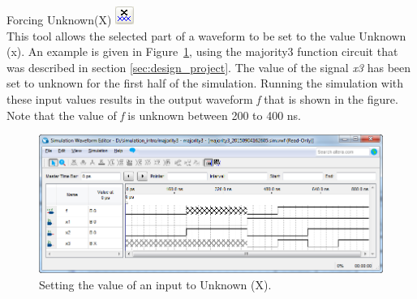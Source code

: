 \documentclass[11pt, twoside, pdftex]{article}
\begin{document}
\begin{description}
	\item {\sf Forcing Unknown(X)} \hbox{\includegraphics[scale=0.7]{figures/appendix/icon3.png}}\\
	This tool allows the selected part of a waveform to be set to the value {\sf Unknown (x)}. An example is given
	in Figure~\ref{fig:fig3}, using the majority3 function circuit that was described in section \ref{sec:design_project}. 
	The value of the signal {\it x3} has been set to unknown for the first half of the simulation. 
	Running the simulation with these input values results in the output waveform {\it f} that is shown in the figure. 
	Note that the value of {\it f} is unknown between 200 to 400 ns. 
	\begin{figure}[H]
	   \begin{center}
	      \includegraphics[scale=0.65]{figures/appendix/figure3.png}
	   \caption{Setting the value of an input to {\sf Unknown (X)}.} 
		 \label{fig:fig3}
		 \end{center}
	\end{figure}	


\end{description}
\end{document}
